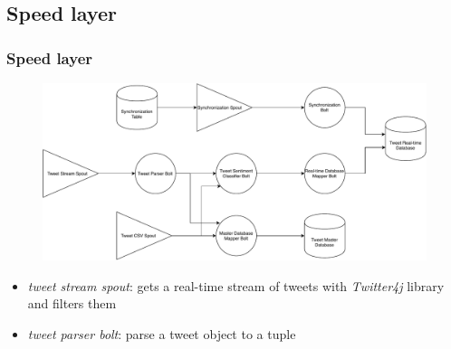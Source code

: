 \documentclass[xcolor=table, unknownkeysallowed]{beamer}
\begin{document}

\subsection{Speed layer}

\begin{frame}
\frametitle{Speed layer}
\vspace{-0.45cm}
\begin{figure}
\includegraphics[width=0.95\linewidth]{img/storm_topology_diagram}
\label{fig:storm_topology_diagram}
\end{figure}
\begin{itemize}
\item \emph{tweet stream spout}: gets a real-time stream of tweets with \emph{Twitter4j} library and filters them
\vspace{0.15cm}
\item \emph{tweet parser bolt}: parse a tweet object to a tuple
\end{itemize}
\end{frame}

\end{document}
